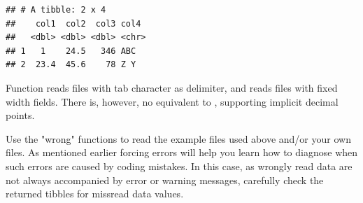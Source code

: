 \documentclass[krantz2]{krantz}\usepackage{knitr}%
\begin{document}
\begin{knitrout}\footnotesize
{}\color{fgcolor}\begin{kframe}
\begin{alltt}
\hlstd{(} \hlstd{=} \hlstd{,}  \hlstd{=} \hlstd{)}
\end{alltt}


{\ttfamily\noindent\itshape\color{messagecolor}{\#\# Parsed with column specification:\\\#\# cols(\\\#\#\ \  col1 = col\_double(),\\\#\#\ \  col2 = col\_double(),\\\#\#\ \  col3 = col\_double(),\\\#\#\ \  col4 = col\_character()\\\#\# )}}\begin{verbatim}
## # A tibble: 2 x 4
##    col1  col2  col3 col4 
##   <dbl> <dbl> <dbl> <chr>
## 1   1    24.5   346 ABC  
## 2  23.4  45.6    78 Z Y
\end{verbatim}
\end{kframe}
\end{knitrout}

Function  reads files with tab character as delimiter, and  reads files with fixed width fields. There is, however, no equivalent to , supporting implicit decimal points.

\begin{playground}
Use the "wrong"  functions to read the example files used above and/or your own files. As mentioned earlier forcing errors will help you learn how to diagnose when such errors are caused by coding mistakes. In this case, as wrongly read data are not always accompanied by error or warning messages, carefully check the returned tibbles for missread data values.
\end{playground}
\end{document}
